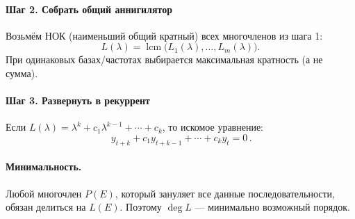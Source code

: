 \paragraph{Шаг 2. Собрать общий аннигилятор}
Возьмём НОК (наименьший общий кратный) всех многочленов из шага 1:
\[
 L(\lambda)=\operatorname{lcm}\big(L_1(\lambda),\ldots,L_m(\lambda)\big).
\]
При одинаковых базах/частотах выбирается максимальная кратность (а не сумма).

\paragraph{Шаг 3. Развернуть в рекуррент}
Если $L(\lambda)=\lambda^k+c_1\lambda^{k-1}+\cdots+c_k$, то искомое уравнение:
\[
 \boxed{\,y_{t+k}+c_1 y_{t+k-1}+\cdots+c_k y_t=0\,}.
\]

\paragraph{Минимальность.}
Любой многочлен $P(E)$, который зануляет все данные последовательности, обязан делиться на $L(E)$. Поэтому $\deg L$ — минимально возможный порядок.

\bigskip

\begin{center}
\end{center}

